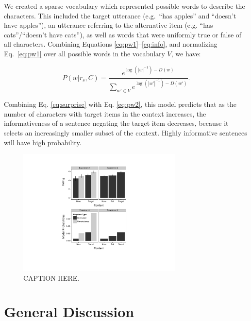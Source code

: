 \documentclass[10pt,letterpaper]{article}
\begin{document}
We created a sparse vocabulary which represented possible words to describe the characters.  This included the target utterance (e.g.\ ``has apples'' and ``doesn't have apples''), an utterance referring to the alternative item (e.g. ``has cats''/``doesn't have cats''), as well as words that were uniformly true or false of all characters. Combining Equations \ref{eq:pw1}--\ref{eq:info}, and normalizing Eq.\ \ref{eq:pw1} over all possible words in the vocabulary $V$, we have:

\begin{equation}\label{eq:pw2}
P(w | r_s, C) = \frac{ e^{\log(|w|^{-1}) - D(w)}} {\sum_{w' \in V}{e^{\log(|w'|^{-1}) - D(w')}}}.
\end{equation}

\noindent Combining Eq. \ref{eq:surprise} with Eq. \ref{eq:pw2}, this model predicts that as the number of characters with target items in the context increases, the informativeness of a sentence negating the target item decreases, because it selects an increasingly smaller subset of the context. Highly informative sentences will have high probability. 

\begin{figure}
\begin{center} 
\includegraphics[width=3.25in]{figures/modelcomp.pdf}
\caption{\label{fig:modelvdata} CAPTION HERE.}
\end{center} 
\end{figure}



\section{General Discussion}



\setlength{\bibleftmargin}{.125in}
\setlength{\bibindent}{-\bibleftmargin}


\end{document}
